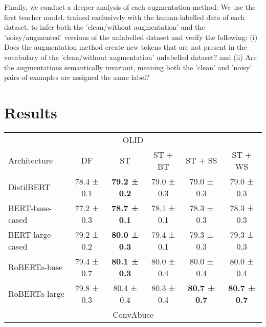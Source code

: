 \documentclass[11pt,a4paper]{article}
\begin{document}
Finally, we conduct a deeper analysis of each augmentation method. We use the first teacher model, trained exclusively with the human-labelled data of each dataset, to infer both the 'clean/without augmentation' and the 'noisy/augmented' versions of the unlabelled dataset and verify the following: (i) Does the augmentation method create new tokens that are not present in the vocabulary of the 'clean/without augmentation' unlabelled dataset? and (ii) Are the augmentations semantically invariant, meaning both the 'clean' and 'noisy' pairs of examples are assigned the same label?

\section{Results}

\begin{table*}
\centering
\begin{tabular}{@{}lccccc@{}}
\toprule
\multicolumn{6}{c}{OLID}                                                                                      \\
Architecture     & DF         & ST                  & ST + BT     & ST + SS             & ST + WS             \\ \midrule
DistilBERT  & 78.4\footnotesize{ ± 0.1} & \textbf{79.2\footnotesize{ ± 0.2}} & 79.0\footnotesize{ ± 0.3}  & 79.0\footnotesize{ ± 0.3}          & 79.0\footnotesize{ ± 0.3}          \\
BERT-base-cased  & 77.2\footnotesize{ ± 0.3} & \textbf{78.7\footnotesize{ ± 0.1}} & 78.1\footnotesize{ ± 0.1}  & 78.3\footnotesize{ ± 0.3}          & 78.3\footnotesize{ ± 0.3}          \\
BERT-large-cased & 79.2\footnotesize{ ± 0.2} & \textbf{80.0\footnotesize{ ± 0.3}} & 79.4\footnotesize{ ± 0.1}  & 79.3\footnotesize{ ± 0.3}          & 79.3\footnotesize{ ± 0.3}          \\
RoBERTa-base     & 79.4\footnotesize{ ± 0.7} & \textbf{80.1\footnotesize{ ± 0.3}} & 80.0\footnotesize{ ± 0.4}  & 80.0\footnotesize{ ± 0.4}          & 80.0\footnotesize{ ± 0.4}          \\
RoBERTa-large    & 79.8\footnotesize{ ± 0.3} & 80.4\footnotesize{ ± 0.4}          & 80.3\footnotesize{ ± 0.4} & \textbf{80.7\footnotesize{ ± 0.7}} & \textbf{80.7\footnotesize{ ± 0.7}} \\ \midrule
\multicolumn{6}{c}{ConvAbuse}                                                                                 \\

\end{tabular}
\end{table*}
\end{document}
